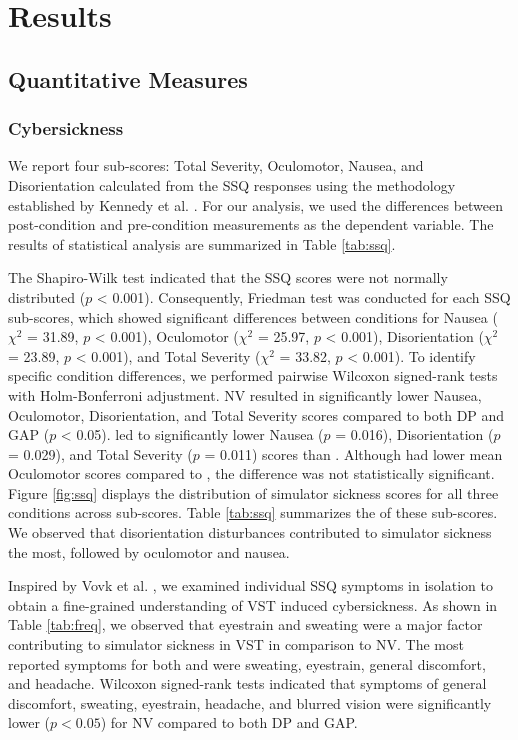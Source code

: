 \section{Results}

\subsection{Quantitative Measures}

\subsubsection{Cybersickness} 
We report four sub-scores: Total Severity, Oculomotor, Nausea, and Disorientation calculated from the SSQ responses using the methodology established by Kennedy et al. \cite{kennedy1993simulator}. For our analysis, we used the differences between post-condition and pre-condition measurements as the dependent variable. The results of statistical analysis are summarized in Table \ref{tab:ssq}.

The Shapiro-Wilk test indicated that the SSQ scores were not normally distributed ($p$ < 0.001). Consequently, Friedman test was conducted for each SSQ sub-scores, which showed significant differences between conditions for Nausea ($\chi^2$ = 31.89, $p$ < 0.001), Oculomotor ($\chi^2$ = 25.97, $p$ < 0.001), Disorientation ($\chi^2$ = 23.89, $p$ < 0.001), and Total Severity ($\chi^2$ = 33.82, $p$ < 0.001). To identify specific condition differences, we performed pairwise Wilcoxon signed-rank tests with Holm-Bonferroni adjustment. NV resulted in significantly lower Nausea, Oculomotor, Disorientation, and Total Severity scores compared to both DP and GAP ($p$ < 0.05). \GAP led to significantly lower Nausea ($p$ = 0.016), Disorientation ($p$ = 0.029), and Total Severity ($p$ = 0.011) scores than \DP. Although \GAP had lower mean Oculomotor scores compared to \DP, the difference was not statistically significant.
Figure \ref{fig:ssq} displays the distribution of simulator sickness scores for all three conditions across sub-scores. Table \ref{tab:ssq} summarizes the  of these sub-scores. We observed that disorientation disturbances contributed to simulator sickness the most, followed by oculomotor and nausea.

Inspired by Vovk et al. \cite{vovk2018simulator}, we examined individual SSQ symptoms in isolation to obtain a fine-grained understanding of VST induced cybersickness. As shown in Table \ref{tab:freq}, we observed that eyestrain and sweating were a major factor contributing to simulator sickness in VST in comparison to NV. The most reported symptoms for both \DP and \GAP were sweating, eyestrain, general discomfort, and headache. Wilcoxon signed-rank tests indicated that symptoms of general discomfort, sweating, eyestrain, headache, and blurred vision were significantly lower ($p<0.05$) for NV compared to both DP and GAP.

